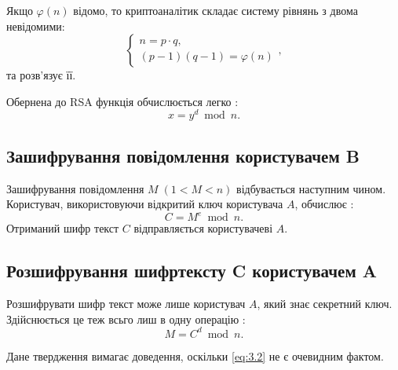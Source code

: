 Якщо $\varphi (n)$ відомо, то криптоаналітик складає систему рівнянь з двома невідомими:
\begin{equation*}
\begin{cases}
    n = p \cdot q, \\
    (p-1)(q-1) = \varphi (n)
\end{cases},
\end{equation*}
та розв'язує її.

Обернена до RSA функція обчислюється легко : 
\begin{equation} 
x = y ^{d} \bmod n.
\end{equation}

\subsection{Зашифрування повідомлення користувачем B}

Зашифрування повідомлення $M \; (1<M<n)$ відбувається наступним чином. Користувач, використовуючи відкритий ключ користувача $A$, обчислює : 
\begin{equation}
C = M^e \bmod n.
\end{equation}
Отриманий шифр текст $C$ відправляється користувачеві $A$.

\subsection{Розшифрування шифртексту C користувачем A}

Розшифрувати шифр текст може лише користувач $A$, який знає секретний ключ. Здійснюється це теж всьго лиш в одну операцію : 
\begin{equation} \label{eq:3.2} 
M = C ^ d \bmod n.
\end{equation}

Дане твердження вимагає доведення, оскільки \eqref{eq:3.2} не є очевидним фактом.

